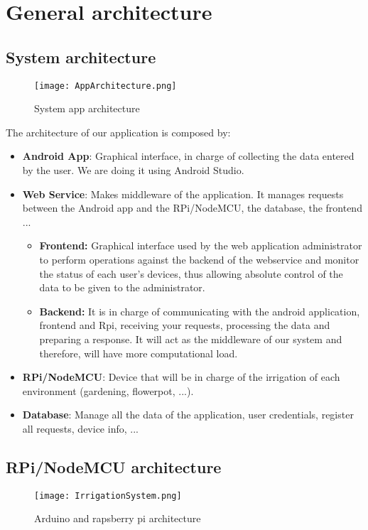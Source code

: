 \documentclass[11pt,a4paper]{article}
\begin{document}
\section{General architecture}
\subsection{System architecture}
\begin{figure}[hbtp]
\centering
\texttt{[image: AppArchitecture.png]}
\caption{System app architecture}
\end{figure}

The architecture of our application is composed by:
\begin{itemize}
\item \textbf{Android App}: Graphical interface, in charge of collecting the data entered by the user. We are doing it using Android Studio.
\item \textbf{Web Service}: Makes middleware of the application. It manages requests between the Android app and the RPi/NodeMCU, the database, the frontend ...
\begin{itemize}
    \item \textbf{Frontend:} Graphical interface used by the web application administrator to perform operations against the backend of the webservice and monitor the status of each user's devices, thus allowing absolute control of the data to be given to the administrator.
    \item \textbf{Backend:} It is in charge of communicating with the android application, frontend and Rpi, receiving your requests, processing the data and preparing a response. It will act as the middleware of our system and therefore, will have more computational load.
\end{itemize}
\item \textbf{RPi/NodeMCU}: Device that will be in charge of the irrigation of each environment (gardening, flowerpot, ...).
\item \textbf{Database}: Manage all the data of the application, user credentials, register all requests, device info, ... 
\end{itemize}

\newpage

\subsection{RPi/NodeMCU architecture}
\begin{figure}[hbtp]
\centering
\texttt{[image: IrrigationSystem.png]}
\caption{Arduino and rapsberry pi architecture}
\end{figure}
\end{document}
